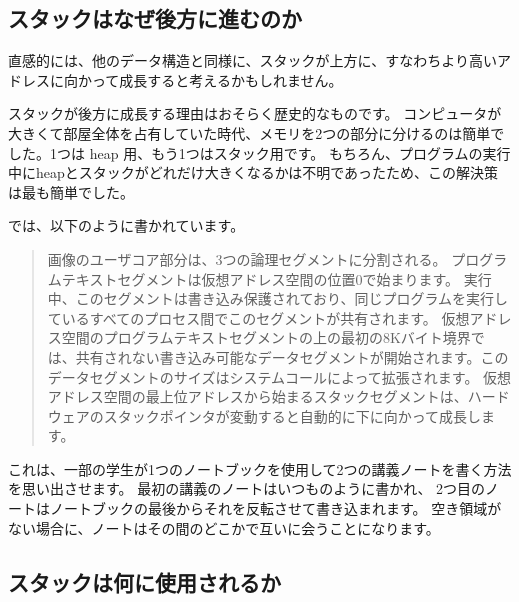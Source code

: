 \subsection{スタックはなぜ後方に進むのか}
\label{stack_grow_backwards}

直感的には、他のデータ構造と同様に、スタックが上方に、すなわちより高いアドレスに向かって成長すると考えるかもしれません。

スタックが後方に成長する理由はおそらく歴史的なものです。 
コンピュータが大きくて部屋全体を占有していた時代、メモリを2つの部分に分けるのは簡単でした。1つは \gls{heap} 用、もう1つはスタック用です。 
もちろん、プログラムの実行中に\gls{heap}とスタックがどれだけ大きくなるかは不明であったため、この解決策は最も簡単でした。



\RitchieThompsonUNIX では、以下のように書かれています。

\begin{framed}
\begin{quotation}
画像のユーザコア部分は、3つの論理セグメントに分割される。 プログラムテキストセグメントは仮想アドレス空間の位置0で始まります。 実行中、このセグメントは書き込み保護されており、同じプログラムを実行しているすべてのプロセス間でこのセグメントが共有されます。 仮想アドレス空間のプログラムテキストセグメントの上の最初の8Kバイト境界では、共有されない書き込み可能なデータセグメントが開始されます。このデータセグメントのサイズはシステムコールによって拡張されます。 仮想アドレス空間の最上位アドレスから始まるスタックセグメントは、ハードウェアのスタックポインタが変動すると自動的に下に向かって成長します。
\end{quotation}
\end{framed}

これは、一部の学生が1つのノートブックを使用して2つの講義ノートを書く方法を思い出させます。
最初の講義のノートはいつものように書かれ、
2つ目のノートはノートブックの最後からそれを反転させて書き込まれます。 
空き領域がない場合に、ノートはその間のどこかで互いに会うことになります。


\subsection{スタックは何に使用されるか}

